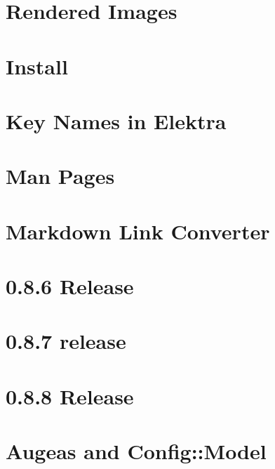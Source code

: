 \let\mypdfximage\pdfximage\def\pdfximage{\immediate\mypdfximage}\documentclass[twoside]{book}
\newcommand{\+}{\discretionary{\mbox{\scriptsize$\hookleftarrow$}}{}{}}
\begin{document}
\chapter{Rendered Images}
\label{doc_images_README_md}

\chapter{Install}
\label{doc_INSTALL_md}

\chapter{Key Names in Elektra}
\label{doc_KEYNAMES_md}

\chapter{Man Pages}
\label{doc_man_README_md}

\chapter{Markdown Link Converter}
\label{doc_markdownlinkconverter_README_md}

\chapter{0.8.6 Release}
\label{doc_news_2014-06-21_0_8_6_md}

\chapter{0.8.7 release}
\label{doc_news_2014-07-28_0_8_7_md}

\chapter{0.8.8 Release}
\label{doc_news_2014-09-02_0_8_8_md}

\chapter{Augeas and Config\+::Model}
\label{doc_news_2014-10-22_augeas_md}

\end{document}

